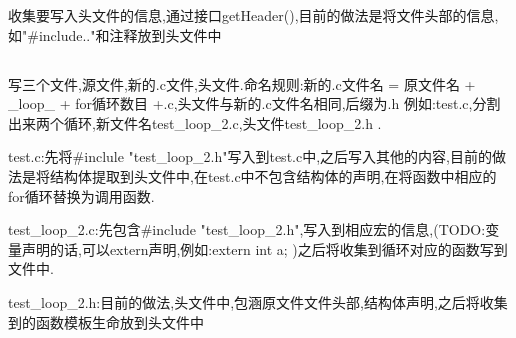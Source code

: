 \par{收集要写入头文件的信息,通过接口getHeader(),目前的做法是将文件头部的信息,如"\#include.."和注释放到头文件中}

\subsection{}


\par{写三个文件,源文件,新的.c文件,头文件.命名规则:新的.c文件名 = 原文件名 + \_loop\_ + for循环数目 +.c,头文件与新的.c文件名相同,后缀为.h 例如:test.c,分割出来两个循环,新文件名test\_loop\_2.c,头文件test\_loop\_2.h .}

\par{test.c:先将\#inclule "test\_loop\_2.h"写入到test.c中,之后写入其他的内容,目前的做法是将结构体提取到头文件中,在test.c中不包含结构体的声明,在将函数中相应的for循环替换为调用函数.}

\par{test\_loop\_2.c:先包含\#include "test\_loop\_2.h",写入到相应宏的信息,(TODO:变量声明的话,可以extern声明,例如:extern int a; )之后将收集到循环对应的函数写到文件中.}

\par{test\_loop\_2.h:目前的做法,头文件中,包涵原文件文件头部,结构体声明,之后将收集到的函数模板生命放到头文件中}


